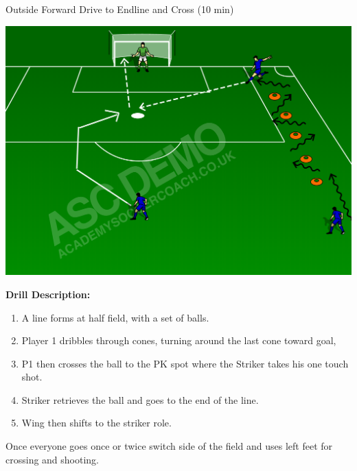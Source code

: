 \begin{evenBlock}{Outside Forward Drive to Endline and Cross (10 min)}

\begin{minipage}[t]{\linewidth}
    \centering
    
    \begin{minipage}{.3\linewidth} %
        \includegraphics[width=\textwidth]{../img/Trimmed/Dribble-Cross-Shoot}
    \end{minipage}
    \hspace{0.05\linewidth}
    \begin{minipage}{.6\linewidth} %
        \textbf{Drill Description:}
        \begin{enumerate}
        \setlength{\itemsep}{0pt}
        \setlength{\parskip}{0pt}
        \setlength{\parsep}{0pt}
        \item A line forms at half field, with a set of balls.
        \item Player 1 dribbles through cones, turning around the last cone toward goal,
        \item P1 then crosses the ball to the PK spot where the Striker takes his one touch shot.
        \item Striker retrieves the ball and goes to the end of the line.
        \item Wing then shifts to the striker role.
        \end{enumerate}

        \vspace{6pt}
        
        Once everyone goes once or twice switch side of the field and uses left feet for crossing and shooting.


\end{minipage}
\end{minipage}
\end{evenBlock}
